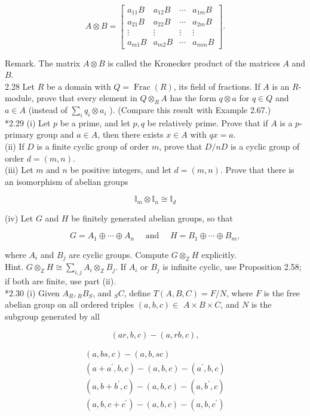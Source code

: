 \documentclass[10pt]{article}
\begin{document}
$$
A \otimes B=\left[\begin{array}{cccc}
a_{11} B & a_{12} B & \cdots & a_{1 m} B \\
a_{21} B & a_{22} B & \cdots & a_{2 m} B \\
\vdots & \vdots & \vdots & \vdots \\
a_{m 1} B & a_{m 2} B & \cdots & a_{m m} B
\end{array}\right] .
$$

Remark. The matrix $A \otimes B$ is called the Kronecker product of the matrices $A$ and $B$.\\
2.28 Let $R$ be a domain with $Q=\operatorname{Frac}(R)$, its field of fractions. If $A$ is an $R$-module, prove that every element in $Q \otimes_{R} A$ has the form $q \otimes a$ for $q \in Q$ and $a \in A$ (instead of $\sum_{i} q_{i} \otimes a_{i}$ ). (Compare this result with Example 2.67.)\\
*2.29 (i) Let $p$ be a prime, and let $p, q$ be relatively prime. Prove that if $A$ is a $p$-primary group and $a \in A$, then there exists $x \in A$ with $q x=a$.\\
(ii) If $D$ is a finite cyclic group of order $m$, prove that $D / n D$ is a cyclic group of order $d=(m, n)$.\\
(iii) Let $m$ and $n$ be positive integers, and let $d=(m, n)$. Prove that there is an isomorphism of abelian groups

$$
\mathbb{I}_{m} \otimes \mathbb{I}_{n} \cong \mathbb{I}_{d}
$$

(iv) Let $G$ and $H$ be finitely generated abelian groups, so that

$$
G=A_{1} \oplus \cdots \oplus A_{n} \quad \text { and } \quad H=B_{1} \oplus \cdots \oplus B_{m},
$$

where $A_{i}$ and $B_{j}$ are cyclic groups. Compute $G \otimes_{\mathbb{Z}} H$ explicitly.\\
Hint. $G \otimes_{\mathbb{Z}} H \cong \sum_{i, j} A_{i} \otimes_{\mathbb{Z}} B_{j}$. If $A_{i}$ or $B_{j}$ is infinite cyclic, use Proposition 2.58; if both are finite, use part (ii).\\
*2.30 (i) Given $A_{R},{ }_{R} B_{S}$, and ${ }_{S} C$, define $T(A, B, C)=F / N$, where $F$ is the free abelian group on all ordered triples $(a, b, c) \in$ $A \times B \times C$, and $N$ is the subgroup generated by all

$$
(a r, b, c)-(a, r b, c),
$$

$$
\begin{gathered}
(a, b s, c)-(a, b, s c) \\
\left(a+a^{\prime}, b, c\right)-(a, b, c)-\left(a^{\prime}, b, c\right) \\
\left(a, b+b^{\prime}, c\right)-(a, b, c)-\left(a, b^{\prime}, c\right) \\
\left(a, b, c+c^{\prime}\right)-(a, b, c)-\left(a, b, c^{\prime}\right)
\end{gathered}
$$
\end{document}

